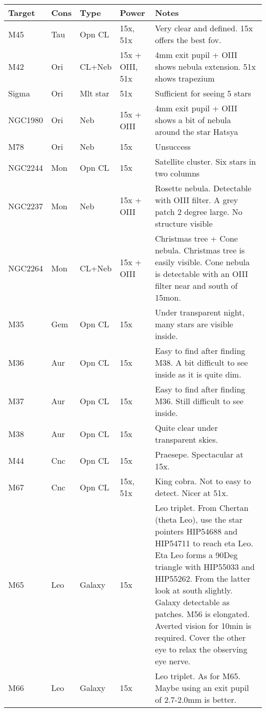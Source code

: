 \begin{longtable}{ p{0.8in}  p{0.3in}  p{0.5in}  p{0.9in}  p{5.8in} }
\hline 
{\bf Target} & {\bf Cons} & {\bf Type} & {\bf Power} & {\bf Notes} \\ 
\hline 
M45 & Tau & Opn CL & 15x, 51x & Very clear and defined. 15x offers the best fov. \\ 
M42 & Ori & CL+Neb & 15x + OIII, 51x & 4mm exit pupil + OIII shows nebula extension. 51x shows trapezium \\ 
Sigma & Ori & Mlt star & 51x & Sufficient for seeing 5 stars \\ 
NGC1980 & Ori & Neb & 15x + OIII & 4mm exit pupil + OIII shows a bit of nebula around the star Hatsya \\ 
M78 & Ori & Neb & 15x & Unsuccess \\ 
NGC2244 & Mon & Opn CL & 15x & Satellite cluster. Six stars in two columns  \\ 
NGC2237 & Mon & Neb & 15x + OIII & Rosette nebula. Detectable with OIII filter. A grey patch 2 degree large. No structure visible \\ 
NGC2264 & Mon & CL+Neb & 15x + OIII & Christmas tree + Cone nebula. Christmas tree is easily visible. Cone nebula is detectable with an OIII filter near and south of 15mon. \\ 
M35 & Gem & Opn CL & 15x & Under transparent night, many stars are visible inside. \\ 
M36 & Aur & Opn CL & 15x & Easy to find after finding M38. A bit difficult to see inside as it is quite dim. \\ 
M37 & Aur & Opn CL & 15x & Easy to find after finding M36. Still difficult to see inside. \\ 
M38 & Aur & Opn CL & 15x & Quite clear under transparent skies. \\ 
M44 & Cnc & Opn CL & 15x & Praesepe. Spectacular at 15x. \\ 
M67 & Cnc & Opn CL & 15x, 51x & King cobra. Not to easy to detect. Nicer at 51x. \\ 
M65 & Leo & Galaxy & 15x & Leo triplet. From Chertan (theta Leo), use the star pointers HIP54688 and HIP54711 to reach eta Leo. Eta Leo forms a 90Deg triangle with HIP55033 and HIP55262. From the latter look at south slightly. Galaxy detectable as patches. M56 is elongated. Averted vision for 10min is required. Cover the other eye to relax the observing eye nerve. \\ 
M66 & Leo & Galaxy & 15x & Leo triplet. As for M65. Maybe using an exit pupil of 2.7-2.0mm is better. \\ 

\end{longtable}
